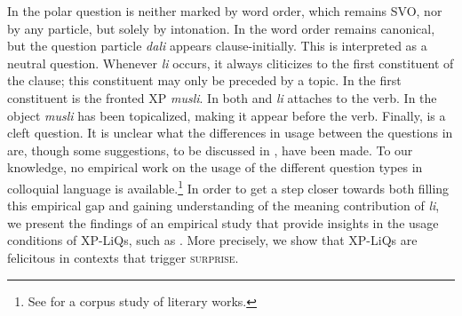 \documentclass[output=paper,
colorlinks,
citecolor=brown,
newtxmath
]{langscibook}
\begin{document}
\noindent
In  the polar question is neither marked by word order, which remains SVO, nor by any particle, but solely by intonation. In  the word order remains canonical, but the question particle \textit{dali} appears clause-initially. This is interpreted as a neutral question.
Whenever \textit{li} occurs, it always cliticizes to the first constituent of the clause; this constituent may only be preceded by a topic. In  the first constituent is the fronted XP \textit{musli}. In both  and  \textit{li} attaches to the verb. In  the object \textit{musli} has been topicalized, making it appear before the verb. Finally,  is a cleft question. It is unclear what the differences in usage between the questions in  are, though some suggestions, to be discussed in , have been made. To our knowledge, no empirical work on the usage of the different question types in colloquial language is available.\footnote{See \citet{englund1977} for a corpus study of literary works.} In order to get a step closer towards both filling this empirical gap and gaining understanding of the mea\-ning contribution of \textit{li}, we present the findings of an empirical study that provide insights in the usage conditions of XP-LiQs, such as . More precisely, we show that XP-LiQs are felicitous in contexts that trigger \textsc{surprise}.
\end{document}
